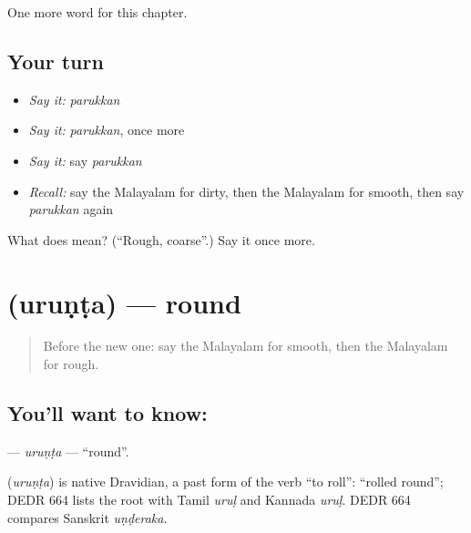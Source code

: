 \begin{grammarlens}[title={What you've built}]
One more word for this chapter.
\end{grammarlens}

\subsection*{Your turn}
\begin{itemize}
\raggedright
  \item \emph{Say it:} \emph{parukkan}
  \item \emph{Say it:} \emph{parukkan}, once more
  \item \emph{Say it:} say \emph{parukkan}
  \item \emph{Recall:} say the Malayalam for dirty, then the Malayalam for smooth, then say \emph{parukkan} again
\end{itemize}

\begin{tcolorbox}[breakable,colback=teal!4,colframe=teal!35!black,title={Before you move on}]
What does  mean? (\textquotedblleft{}Rough, coarse\textquotedblright{}.) Say it once more.
\end{tcolorbox}
\section[\texorpdfstring{\ml{ഉരുണ്ട} (uruṇṭa)}{ഉരുണ്ട (uruṇṭa)}]{ (uruṇṭa) — round}

\label{lesson:ML-C204-urunta}



\begin{quote}
Before the new one: say the Malayalam for smooth, then the Malayalam for rough.
\end{quote}

\subsection*{You'll want to know: }
\textbf{} — \emph{uruṇṭa} — \textquotedblleft{}round\textquotedblright{}.

\begin{cousinweb}
\textbf{} (\emph{uruṇṭa}) is native Dravidian, a past form of the verb \textquotedblleft{}to roll\textquotedblright{}: \textquotedblleft{}rolled round\textquotedblright{}; DEDR 664 lists the root with Tamil \emph{uruḷ} and Kannada \emph{uruḷ}. DEDR 664 compares Sanskrit \emph{uṇḍeraka}.
\end{cousinweb}

